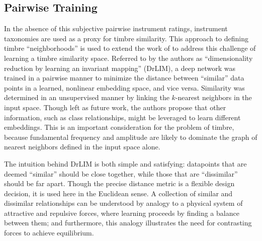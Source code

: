 \subsection{Pairwise Training}
\label{subsec:timbre_pairwise}

In the absence of this subjective pairwise instrument ratings, instrument taxonomies are used as a proxy for timbre similarity.
This approach to defining timbre ``neighborhoods'' is used to extend the work of \cite{Hadsell2006Dimensionality} to address this challenge of learning a timbre similarity space.
Referred to by the authors as ``dimensionality reduction by learning an invariant mapping'' (DrLIM), a deep network was trained in a pairwise manner to minimize the distance between ``similar'' data points in a learned, nonlinear embedding space, and vice versa.
Similarity was determined in an unsupervised manner by linking the $k$-nearest neighbors in the input space.
Though left as future work, the authors propose that other information, such as class relationships, might be leveraged to learn different embeddings.
This is an important consideration for the problem of timbre, because fundamental frequency and amplitude are likely to dominate the graph of nearest neighbors defined in the input space alone.

The intuition behind DrLIM is both simple and satisfying: datapoints that are deemed ``similar'' should be close together, while those that are ``dissimilar'' should be far apart.
Though the precise distance metric is a flexible design decision, it is used here in the Euclidean sense.
A collection of similar and dissimilar relationships can be understood by analogy to a physical system of attractive and repulsive forces, where learning proceeds by finding a balance between them; and furthermore, this analogy illustrates the need for contrasting forces to achieve equilibrium.

